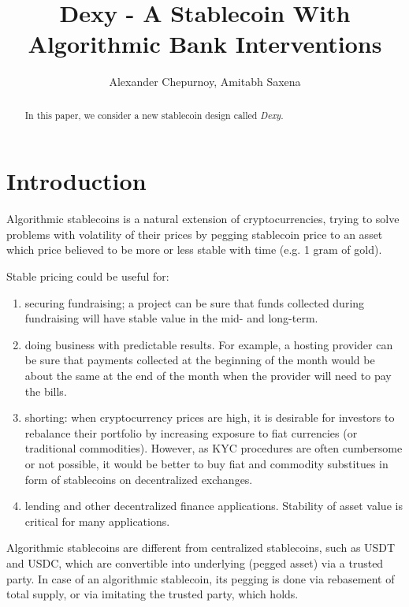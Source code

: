 \documentclass{article}   %
\begin{document}
\title{Dexy - A Stablecoin With Algorithmic Bank Interventions}
\author{Alexander Chepurnoy, Amitabh Saxena}


\maketitle

\begin{abstract}
In this paper, we consider a new stablecoin design called \em{Dexy}.
\end{abstract}

% 

\section{Introduction}

Algorithmic stablecoins is a natural extension of cryptocurrencies, trying to 
solve problems with volatility of their prices by pegging stablecoin price to an
asset which price believed to be more or less stable with time (e.g. 1 gram of gold).  

Stable pricing could be useful for:
\begin{enumerate}
\item securing fundraising; a project can be sure that funds collected during fundraising will have stable value in the mid- and long-term.
\item doing business with predictable results. For example, a hosting provider can be sure that payments collected at the beginning of the month 
      would be about the same at the end of the month when the provider will need to pay the bills. 
\item shorting: when cryptocurrency prices are high, it is desirable for investors to rebalance their portfolio by increasing exposure to fiat currencies (or traditional
 commodities). However, as KYC procedures are often cumbersome or not possible, it would be better to buy fiat and commodity substitues in form of stablecoins on decentralized exchanges.
\item lending and other decentralized finance applications. Stability of asset value is critical for many applications.
\end{enumerate}

Algorithmic stablecoins are different from centralized stablecoins, such as USDT and USDC, which are 
convertible into underlying (pegged asset) via a trusted party. In case of an algorithmic stablecoin, its 
pegging is done via rebasement of total supply, or via imitating the trusted party, which holds. 
\end{document}
